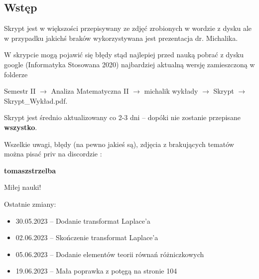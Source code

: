 \subsection{Wstęp}

Skrypt jest w większości przepisywany ze zdjęć zrobionych w wordzie z dysku ale w przypadku jakichś braków wykorzystywana jest
prezentacja dr. Michalika. 

W skrypcie mogą pojawić się błędy stąd najlepiej przed nauką pobrać z dysku google \linebreak (Informatyka Stosowana 2020) najbardziej aktualną wersję
zamieszczoną w folderze 

Semestr II $\rightarrow$ Analiza Matematyczna II $\rightarrow$ michalik wykłady $\rightarrow$ Skrypt $\rightarrow$ Skrypt\_Wykład.pdf.

Skrypt jest średnio aktualizowany co 2-3 dni -- dopóki nie zostanie przepisane \textbf{wszystko}. \medskip

Wszelkie uwagi, błędy (na pewno jakieś są), zdjęcia z brakujących tematów można pisać priv na discordzie : 

\textbf{tomaszstrzelba}

Miłej nauki! \bigskip

Ostatnie zmiany:
\begin{itemize}
    \item 30.05.2023 -- Dodanie transformat Laplace'a
    \item 02.06.2023 -- Skończenie transformat Laplace'a
    \item 05.06.2023 -- Dodanie elementów teorii równań różniczkowych
    \item 19.06.2023 -- Mała poprawka z potęgą na stronie 104
\end{itemize}